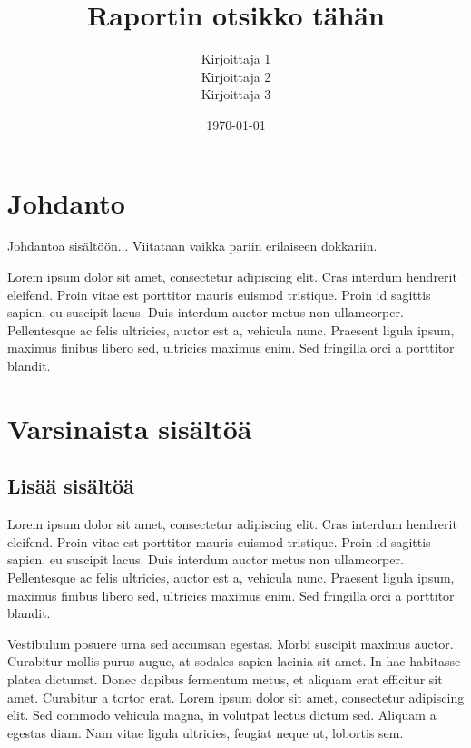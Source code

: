 \documentclass[titlepage]{article}
\title{Raportin otsikko tähän}
\author{Kirjoittaja 1\\
        Kirjoittaja 2\\
        Kirjoittaja 3}
\date{\today}
\begin{document}
\maketitle
\tableofcontents
\newpage

\pagestyle{headings}



\section{Johdanto}

Johdantoa sisältöön...
Viitataan vaikka pariin\cite{vahakainu_et_al} erilaiseen\cite{maenpaa_peltola} dokkariin\cite{wahle_et_al}.

Lorem ipsum dolor sit amet, consectetur adipiscing elit. Cras interdum hendrerit eleifend. Proin vitae est porttitor mauris euismod tristique. Proin id sagittis sapien, eu suscipit lacus. Duis interdum auctor metus non ullamcorper. Pellentesque ac felis ultricies, auctor est a, vehicula nunc. Praesent ligula ipsum, maximus finibus libero sed, ultricies maximus enim. Sed fringilla orci a porttitor blandit.

\section{Varsinaista sisältöä}

\subsection{Lisää sisältöä}

Lorem ipsum dolor sit amet, consectetur adipiscing elit. Cras interdum hendrerit eleifend. Proin vitae est porttitor mauris euismod tristique. Proin id sagittis sapien, eu suscipit lacus. Duis interdum auctor metus non ullamcorper. Pellentesque ac felis ultricies, auctor est a, vehicula nunc. Praesent ligula ipsum, maximus finibus libero sed, ultricies maximus enim. Sed fringilla orci a porttitor blandit.

Vestibulum posuere urna sed accumsan egestas. Morbi suscipit maximus auctor. Curabitur mollis purus augue, at sodales sapien lacinia sit amet. In hac habitasse platea dictumst. Donec dapibus fermentum metus, et aliquam erat efficitur sit amet. Curabitur a tortor erat. Lorem ipsum dolor sit amet, consectetur adipiscing elit. Sed commodo vehicula magna, in volutpat lectus dictum sed. Aliquam a egestas diam. Nam vitae ligula ultricies, feugiat neque ut, lobortis sem.
\end{document}
